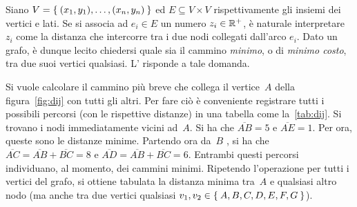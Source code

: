 Siano $V=\Set{(x_1,y_1),\dots,(x_n,y_n)}$ ed $E\subseteq V\times V$ rispettivamente gli insiemi dei vertici e lati. 
Se si associa ad $e_{i}\in E$ un numero $z_i\in\mathbb{R}^+$, è naturale interpretare $z_i$ come la distanza che intercorre tra i due nodi collegati dall'arco $e_i$.
Dato un grafo, è dunque lecito chiedersi quale sia il cammino \emph{minimo}, o di \emph{minimo costo}, tra due suoi vertici qualsiasi.
L' risponde a tale domanda.


Si vuole calcolare il cammino più breve che collega il vertice~$A$ %
della figura~\ref{fig:dij} con tutti gli altri.
Per fare ciò è conveniente registrare tutti i possibili percorsi (con le rispettive distanze) in una tabella come la~\ref{tab:dij}.
Si trovano i nodi immediatamente vicini ad~$A$. %
Si ha che $\overline{AB}=5$ e $\overline{AE}=1$.
Per ora, queste sono le distanze minime.
Partendo ora da~$B$%
, si ha che $\overline{AC}=\overline{AB}+\overline{BC}=8$ e $\overline{AD}=\overline{AB}+\overline{BC}=6$.
Entrambi questi percorsi individuano, al momento, dei cammini minimi.
Ripetendo l'operazione per tutti i vertici del grafo, si ottiene tabulata la distanza minima tra~$A$%
 e qualsiasi altro nodo (ma anche tra due vertici qualsiasi $v_1,v_2\in\Set{A, B, C, D, E, F, G}$).
